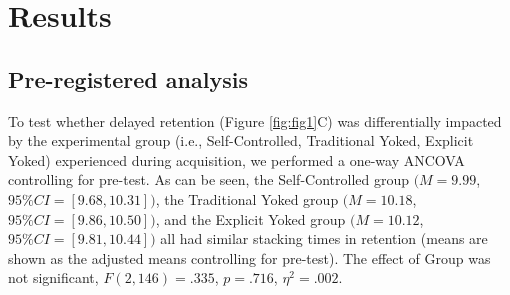\documentclass[
  english,
  jou]{apa7}
\begin{document}
\hypertarget{results}{%
\section{Results}\label{results}}

\hypertarget{pre-registered-analysis}{%
\subsection{Pre-registered analysis}\label{pre-registered-analysis}}

To test whether delayed retention (Figure \ref{fig:fig1}C) was differentially impacted by the experimental group (i.e., Self-Controlled, Traditional Yoked, Explicit Yoked) experienced during acquisition, we performed a one-way ANCOVA controlling for pre-test. As can be seen, the Self-Controlled group \((M = 9.99\), \(95\%CI = [9.68,10.31])\), the Traditional Yoked group \((M = 10.18\), \(95\%CI = [9.86,10.50])\), and the Explicit Yoked group \((M = 10.12\), \(95\%CI = [9.81,10.44])\) all had similar stacking times in retention (means are shown as the adjusted means controlling for pre-test). The effect of Group was not significant, \(F(2,146) = .335\), \(p = .716\), \(\eta^2 = .002\).
\end{document}
